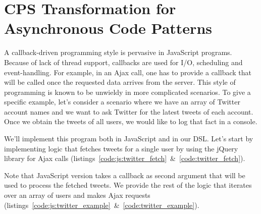 \documentclass[runningheads,a4paper]{llncs}
\begin{document}

\section{CPS Transformation for Asynchronous Code Patterns}\label{sec:cps}
  A callback-driven programming style is pervasive in JavaScript programs. Because of lack of thread support, callbacks are used for I/O, scheduling and event-handling. For example, in an Ajax call, one has to provide a callback that will be called once the requested data arrives from the server. This style of programming is known to be unwieldy in more complicated scenarios. To give a specific example, let's consider a scenario where we have an array of Twitter account names and we want to ask Twitter for the latest tweets of each account. Once we obtain the tweets of all users, we would like to log that fact in a console.

We'll implement this program both in JavaScript and in our DSL. Let's start by implementing logic that fetches tweets for a single user by using the jQuery library for Ajax calls (listings~\ref{code:js:twitter_fetch}~\&~\ref{code:twitter_fetch}).

\lstset{basicstyle=\ttfamily\scriptsize}
\begin{figure}
\setlength{\columnseprule}{0.5pt}
\begin{changemargin}{-1.5cm}{-1.5cm}
\begin{multicols}{2}


\end{multicols}
\end{changemargin}
\end{figure}

Note that JavaScript version takes a callback as second argument that will be used to process the fetched tweets. We provide the rest of the logic that iterates over an array of users and makes Ajax requests (listings~\ref{code:js:twitter_example}~\&~\ref{code:twitter_example}).

\begin{figure}
\begin{changemargin}{-0.7cm}{-0.7cm}
\setlength{\columnseprule}{0.5pt}
\begin{multicols}{2}


\end{multicols}
\end{changemargin}
\end{figure}
\end{document}
